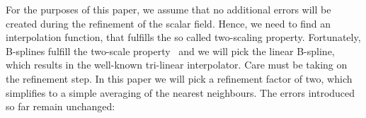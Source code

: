 
For the purposes of this paper, we assume that no additional 
errors will be created during the refinement of the scalar field. 
Hence, we need to find an interpolation function, that fulfills the 
so called two-scaling property. Fortunately, B-splines fulfill the 
two-scale property~\cite{799930} and we will pick the linear B-spline, 
which results in the well-known tri-linear interpolator. Care must 
be taking on the refinement step. In this paper we will pick a 
refinement factor of two, which simplifies to a simple averaging of 
the nearest neighbours. The errors introduced so far remain 
unchanged:

